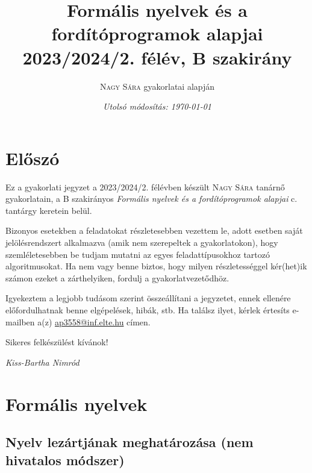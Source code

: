 \documentclass[a4paper,11pt]{article}
\begin{document}
\author{\textsc{Nagy Sára} gyakorlatai alapján}
\title{\textbf{Formális nyelvek és a fordítóprogramok alapjai} \\ {\Large 2023/2024/2. félév, B szakirány} }
\date{\textit{Utolsó módosítás: \today}}

\maketitle

\section*{Előszó}

Ez a gyakorlati jegyzet a 2023/2024/2. félévben készült \textsc{Nagy Sára} tanárnő gyakorlatain, a B szakirányos \textit{Formális nyelvek és a fordítóprogramok alapjai} c. tantárgy keretein belül.

Bizonyos esetekben a feladatokat részletesebben vezettem le, adott esetben saját jelölésrendszert alkalmazva (amik nem szerepeltek a gyakorlatokon), hogy szemléletesebben be tudjam mutatni az egyes feladattípusokhoz tartozó algoritmusokat. Ha nem vagy benne biztos, hogy milyen részletességgel kér(het)ik számon ezeket a zárthelyiken, fordulj a gyakorlatvezetődhöz.

Igyekeztem a legjobb tudásom szerint összeállítani a jegyzetet, ennek ellenére előfordulhatnak benne elgépelések, hibák, stb. Ha találsz ilyet, kérlek értesíts e-mailben a(z) \href{mailto:ap3558@inf.elte.hu}{ap3558@inf.elte.hu} címen.

Sikeres felkészülést kívánok!


\begin{flushright}
	\textit{Kiss-Bartha Nimród}
\end{flushright}

\tableofcontents

\newpage


\section{Formális nyelvek}

\subsection{Nyelv lezártjának meghatározása (nem hivatalos módszer)}

~\\[-2em]
\end{document}
